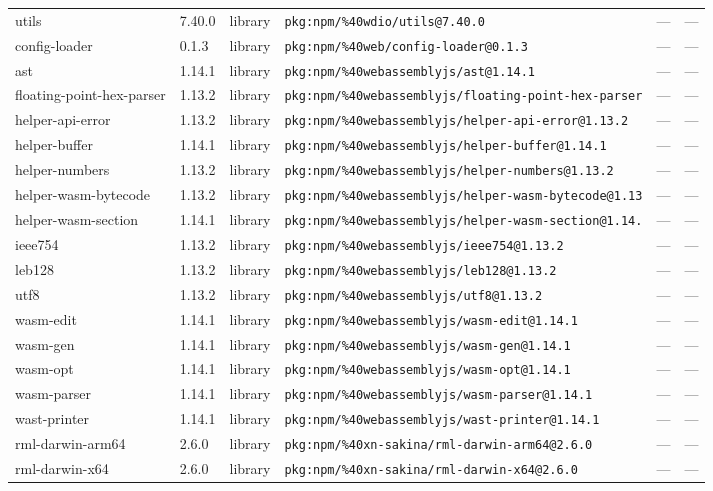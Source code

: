 \documentclass[11pt]{article}
\begin{document}
\begin{longtable}{|l|l|l|p{2.2cm}|l|p{4cm}|}
utils & 7.40.0 & library & \texttt{pkg:npm/\%40wdio/utils@7.40.0} & — & — \\
config-loader & 0.1.3 & library & \texttt{pkg:npm/\%40web/config-loader@0.1.3} & — & — \\
ast & 1.14.1 & library & \texttt{pkg:npm/\%40webassemblyjs/ast@1.14.1} & — & — \\
floating-point-hex-parser & 1.13.2 & library & \texttt{pkg:npm/\%40webassemblyjs/floating-point-hex-parser} & — & — \\
helper-api-error & 1.13.2 & library & \texttt{pkg:npm/\%40webassemblyjs/helper-api-error@1.13.2} & — & — \\
helper-buffer & 1.14.1 & library & \texttt{pkg:npm/\%40webassemblyjs/helper-buffer@1.14.1} & — & — \\
helper-numbers & 1.13.2 & library & \texttt{pkg:npm/\%40webassemblyjs/helper-numbers@1.13.2} & — & — \\
helper-wasm-bytecode & 1.13.2 & library & \texttt{pkg:npm/\%40webassemblyjs/helper-wasm-bytecode@1.13} & — & — \\
helper-wasm-section & 1.14.1 & library & \texttt{pkg:npm/\%40webassemblyjs/helper-wasm-section@1.14.} & — & — \\
ieee754 & 1.13.2 & library & \texttt{pkg:npm/\%40webassemblyjs/ieee754@1.13.2} & — & — \\
leb128 & 1.13.2 & library & \texttt{pkg:npm/\%40webassemblyjs/leb128@1.13.2} & — & — \\
utf8 & 1.13.2 & library & \texttt{pkg:npm/\%40webassemblyjs/utf8@1.13.2} & — & — \\
wasm-edit & 1.14.1 & library & \texttt{pkg:npm/\%40webassemblyjs/wasm-edit@1.14.1} & — & — \\
wasm-gen & 1.14.1 & library & \texttt{pkg:npm/\%40webassemblyjs/wasm-gen@1.14.1} & — & — \\
wasm-opt & 1.14.1 & library & \texttt{pkg:npm/\%40webassemblyjs/wasm-opt@1.14.1} & — & — \\
wasm-parser & 1.14.1 & library & \texttt{pkg:npm/\%40webassemblyjs/wasm-parser@1.14.1} & — & — \\
wast-printer & 1.14.1 & library & \texttt{pkg:npm/\%40webassemblyjs/wast-printer@1.14.1} & — & — \\
rml-darwin-arm64 & 2.6.0 & library & \texttt{pkg:npm/\%40xn-sakina/rml-darwin-arm64@2.6.0} & — & — \\
rml-darwin-x64 & 2.6.0 & library & \texttt{pkg:npm/\%40xn-sakina/rml-darwin-x64@2.6.0} & — & — \\

\end{longtable}
\end{document}
